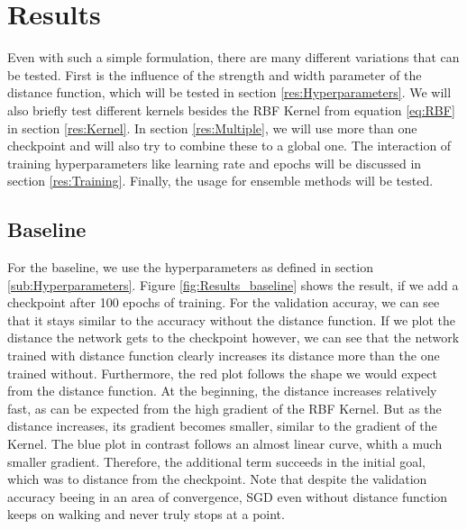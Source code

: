 \chapter{Results}
Even with such a simple formulation, there are many different variations that
can be tested. First is the influence of the strength and width parameter of the
distance function, which will be tested in section \ref{res:Hyperparameters}. We
will also briefly test different kernels besides the RBF Kernel from equation
\ref{eq:RBF} in section \ref{res:Kernel}. In section \ref{res:Multiple}, we will
use more than one checkpoint and will also try to combine these to a global one.
The interaction of training hyperparameters like learning rate and epochs will
be discussed in section \ref{res:Training}. Finally, the usage for ensemble
methods will be tested.

\section{Baseline}
For the baseline, we use the hyperparameters as defined in section
\ref{sub:Hyperparameters}. Figure \ref{fig:Results_baseline} shows the result,
if we add a checkpoint after 100 epochs of training. For the validation accuray,
we can see that it stays similar to the accuracy without the distance function.
If we plot the distance the network gets to the checkpoint however, we can see
that the network trained with distance function clearly increases its distance
more than the one trained without. Furthermore, the red plot follows the shape
we would expect from the distance function. At the beginning, the distance
increases relatively fast, as can be expected from the high gradient of the RBF
Kernel. But as the distance increases, its gradient becomes smaller, similar to
the gradient of the Kernel. The blue plot in contrast follows an almost linear
curve, whith a much smaller gradient. Therefore, the additional term succeeds in
the initial goal, which was to distance from the checkpoint. Note that despite
the validation accuracy beeing in an area of convergence, SGD even without
distance function keeps on walking and never truly stops at a point.

